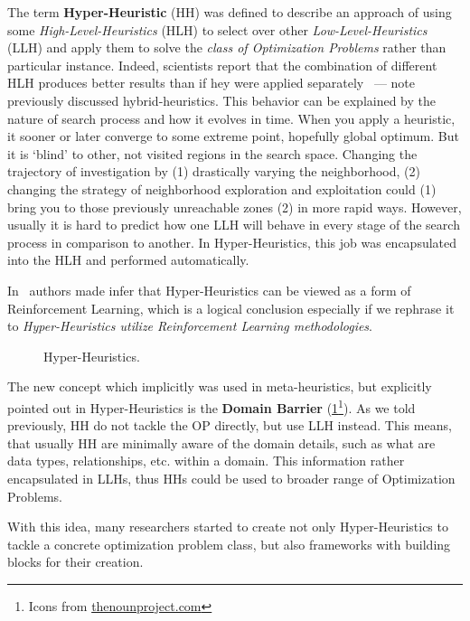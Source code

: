 The term \textbf{Hyper-Heuristic} (HH) was defined to describe an approach of using some \textit{High-Level-Heuristics} (HLH) to select over other \textit{Low-Level-Heuristics} (LLH) and apply them to solve the \textit{class of Optimization Problems} rather than particular instance. Indeed, scientists report that the combination of different HLH produces better results than if hey were applied separately~\cite{drake2019recent} — note previously discussed hybrid-heuristics.
This behavior can be explained by the nature of search process and how it evolves in time. When you apply a heuristic, it sooner or later converge to some extreme point, hopefully global optimum. But it is `blind' to other, not visited regions in the search space. Changing the trajectory of investigation by (1) drastically varying the neighborhood, (2) changing the strategy of neighborhood exploration and exploitation could (1) bring you to those previously unreachable zones (2) in more rapid ways. However, usually it is hard to predict how one LLH will behave in every stage of the search process in comparison to another. In Hyper-Heuristics, this job was encapsulated into the HLH and performed automatically. 

In~\cite{moriarty1999evolutionary} authors made infer that Hyper-Heuristics can be viewed as a form of Reinforcement Learning, which is a logical conclusion especially if we rephrase it to \textit{Hyper-Heuristics utilize Reinforcement Learning methodologies}.

\begin{figure}
	\centering
	
	\caption[Hyper-Heuristics]{Hyper-Heuristics.}
	\label{bg:pic:HH}
\end{figure}

The new concept which implicitly was used in meta-heuristics, but explicitly pointed out in Hyper-Heuristics is the \textbf{Domain Barrier} (\cref{bg:pic:HH}\footnote{Icons from \href{thenounproject.com/}{thenounproject.com}}).
As we told previously, HH do not tackle the OP directly, but use LLH instead. This means, that usually HH are minimally aware of the domain details, such as what are data types, relationships, etc. within a domain. This information rather encapsulated in LLHs, thus HHs could be used to broader range of Optimization Problems.

With this idea, many researchers started to create not only Hyper-Heuristics to tackle a concrete optimization problem class, but also frameworks with building blocks for their creation.


